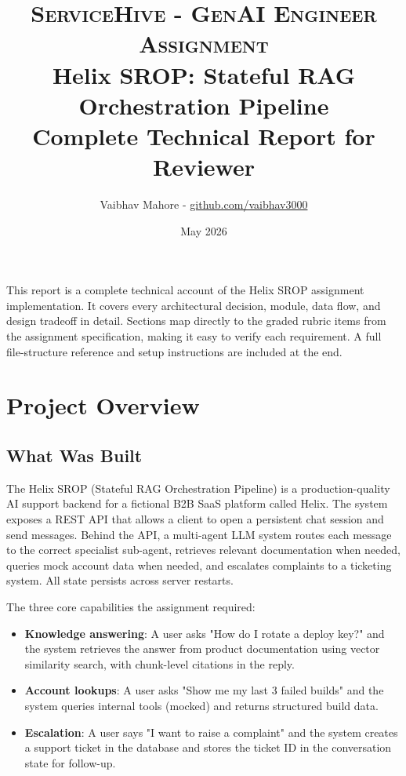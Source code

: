 \documentclass[12pt,a4paper]{article}
\title{%
  {\large\color{darkgray}\textsc{ServiceHive - GenAI Engineer Assignment}}\\[0.5em]
  {\LARGE\bfseries\color{primary} Helix SROP: Stateful RAG Orchestration Pipeline}\\[0.3em]
  {\large\color{darkgray} Complete Technical Report for Reviewer}
}
\author{Vaibhav Mahore - \href{https://github.com/vaibhav3000}{github.com/vaibhav3000}}
\date{May 2026}
\begin{document}
\maketitle
\thispagestyle{fancy}

\vspace{0.5em}
\begin{tcolorbox}[defbox, title={Document Purpose}]
This report is a complete technical account of the Helix SROP assignment implementation. It covers every architectural decision, module, data flow, and design tradeoff in detail. Sections map directly to the graded rubric items from the assignment specification, making it easy to verify each requirement. A full file-structure reference and setup instructions are included at the end.
\end{tcolorbox}

\tableofcontents
\newpage

\section{Project Overview}

\subsection{What Was Built}

The Helix SROP (Stateful RAG Orchestration Pipeline) is a production-quality AI support backend for a fictional B2B SaaS platform called Helix. The system exposes a REST API that allows a client to open a persistent chat session and send messages. Behind the API, a multi-agent LLM system routes each message to the correct specialist sub-agent, retrieves relevant documentation when needed, queries mock account data when needed, and escalates complaints to a ticketing system. All state persists across server restarts.

The three core capabilities the assignment required:

\begin{itemize}[leftmargin=1.5em]
  \item \textbf{Knowledge answering}: A user asks "How do I rotate a deploy key?" and the system retrieves the answer from product documentation using vector similarity search, with chunk-level citations in the reply.
  \item \textbf{Account lookups}: A user asks "Show me my last 3 failed builds" and the system queries internal tools (mocked) and returns structured build data.
  \item \textbf{Escalation}: A user says "I want to raise a complaint" and the system creates a support ticket in the database and stores the ticket ID in the conversation state for follow-up.
\end{itemize}
\end{document}
